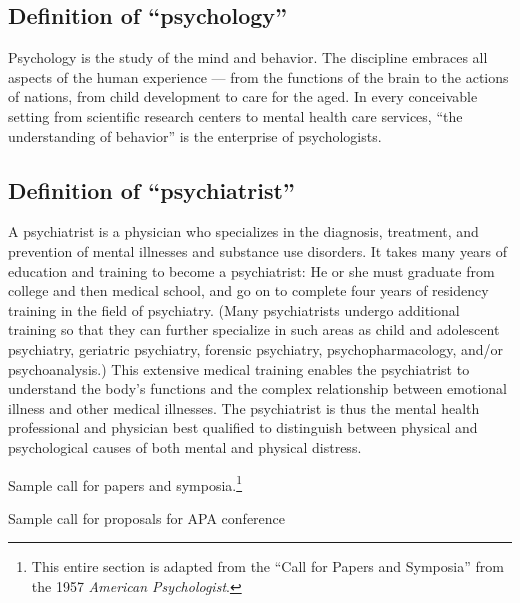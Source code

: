\begin{refsection}
\subsection{Definition of ``psychology''}
\label{definitionofpsychology}

Psychology is the study of the mind and behavior. The discipline embraces all aspects of the human experience — from the functions of the brain to the actions of nations, from child development to care for the aged. In every conceivable setting from scientific research centers to mental health care services, ``the understanding of behavior'' is the enterprise of psychologists.

\subsection{Definition of “psychiatrist”}
\label{definitionof“psychiatrist”}

A psychiatrist is a physician who specializes in the diagnosis, treatment, and prevention of mental illnesses and substance use disorders. It takes many years of education and training to become a psychiatrist: He or she must graduate from college and then medical school, and go on to complete four years of residency training in the field of psychiatry. (Many psychiatrists undergo additional training so that they can further specialize in such areas as child and adolescent psychiatry, geriatric psychiatry, forensic psychiatry, psychopharmacology, and\slash or psychoanalysis.) This extensive medical training enables the psychiatrist to understand the body's functions and the complex relationship between emotional illness and other medical illnesses. The psychiatrist is thus the mental health professional and physician best qualified to distinguish between physical and psychological causes of both mental and physical distress.

\newpage

Sample call for papers and symposia.\footnote{This entire section is adapted from the “Call for Papers and Symposia” from the 1957 \emph{American Psychologist}.}


\begin{apatextbox}{Sample call for proposals for APA conference}  

\label{callforpapersandsymposia----}


\end{apatextbox}
\end{refsection}
